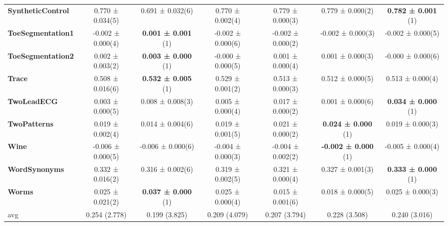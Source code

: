 \begin{table}[ht]
\begin{adjustbox}{width=\textwidth}
\begin{tabular}{lcccccc}
    \textbf{SyntheticControl} & 0.770 ± 0.034(5) & 0.691 ± 0.032(6) & 0.770 ± 0.002(4) & 0.779 ± 0.000(3) & 0.779 ± 0.000(2) & \textbf{0.782 ± 0.001} (1) \\
    \textbf{ToeSegmentation1} & -0.002 ± 0.000(4) & \textbf{0.001 ± 0.001} (1) & -0.002 ± 0.000(6) & -0.002 ± 0.000(2) & -0.002 ± 0.000(3) & -0.002 ± 0.000(5) \\
    \textbf{ToeSegmentation2} & 0.002 ± 0.003(2) & \textbf{0.003 ± 0.000} (1) & -0.000 ± 0.000(5) & 0.001 ± 0.000(4) & 0.001 ± 0.000(3) & -0.000 ± 0.000(6) \\
    \textbf{Trace} & 0.508 ± 0.016(6) & \textbf{0.532 ± 0.005} (1) & 0.529 ± 0.001(2) & 0.513 ± 0.000(3) & 0.512 ± 0.000(5) & 0.513 ± 0.000(4) \\
    \textbf{TwoLeadECG} & 0.003 ± 0.000(5) & 0.008 ± 0.008(3) & 0.005 ± 0.000(4) & 0.017 ± 0.000(2) & 0.001 ± 0.000(6) & \textbf{0.034 ± 0.000} (1) \\
    \textbf{TwoPatterns} & 0.019 ± 0.002(4) & 0.014 ± 0.004(6) & 0.019 ± 0.001(5) & 0.021 ± 0.000(2) & \textbf{0.024 ± 0.000} (1) & 0.019 ± 0.000(3) \\
    \textbf{Wine} & -0.006 ± 0.000(5) & -0.006 ± 0.000(6) & -0.004 ± 0.000(3) & -0.004 ± 0.002(2) & \textbf{-0.002 ± 0.000} (1) & -0.005 ± 0.000(4) \\
    \textbf{WordSynonyms} & 0.332 ± 0.016(2) & 0.316 ± 0.002(6) & 0.319 ± 0.002(5) & 0.321 ± 0.000(4) & 0.327 ± 0.001(3) & \textbf{0.333 ± 0.000} (1) \\
    \textbf{Worms} & 0.025 ± 0.021(2) & \textbf{0.037 ± 0.000} (1) & 0.025 ± 0.000(4) & 0.015 ± 0.001(6) & 0.018 ± 0.000(5) & 0.025 ± 0.000(3) \\
    \hline 
    avg & 0.254 (2.778) & 0.199 (3.825) & 0.209 (4.079) & 0.207 (3.794) & 0.228 (3.508) & 0.240 (3.016) \\ 
    \hline
    \end{tabular}
    \end{adjustbox}
    \end{table}
    
    
    
